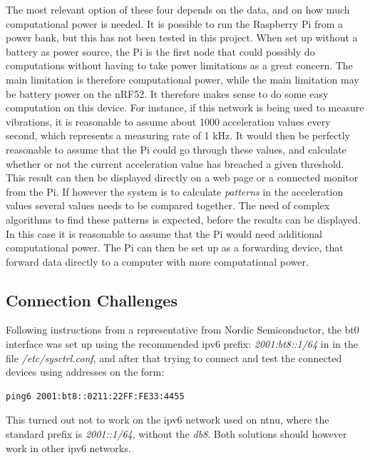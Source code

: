 \noindent The most relevant option of these four depends on the data, and on how much computational power is needed. It is possible to run the Raspberry Pi from a power bank, but this has not been tested in this project. When set up without a battery as power source, the Pi is the first node that could possibly do computations without having to take power limitations as a great concern. The main limitation is therefore computational power, while the main limitation may be battery power on the nRF52. It therefore makes sense to do some easy computation on this device. For instance, if this network is being used to measure vibrations, it is reasonable to assume about 1000 acceleration values every second, which represents a measuring rate of 1 kHz. It would then be perfectly reasonable to assume that the Pi could go through these values, and calculate whether or not the current acceleration value has breached a given threshold. This result can then be displayed directly on a web page or a connected monitor from the Pi. If however the system is to calculate \textit{patterns} in the acceleration values several values needs to be compared together. The need of complex algorithms to find these patterns is expected, before the results can be displayed. In this case it is reasonable to assume that the Pi would need additional computational power. The Pi can then be set up as a forwarding device, that forward data directly to a computer with more computational power. 


\subsection{Connection Challenges} %

\noindent Following instructions from a representative from Nordic Semiconductor, the bt0 interface was set up using the recommended \gls{ipv6} prefix: \textit{2001:bt8::1/64} in in the file \textit{/etc/sysctrl.conf}, and after that trying to connect and test the connected devices using addresses on the form: 

\begin{verbatim}
ping6 2001:bt8::0211:22FF:FE33:4455
\end{verbatim}

\noindent This turned out not to work on the \gls{ipv6} network used on \gls{ntnu}, where the standard prefix is \textit{2001::1/64}, without the \textit{db8}. Both solutions should however work in other \gls{ipv6} networks. 



